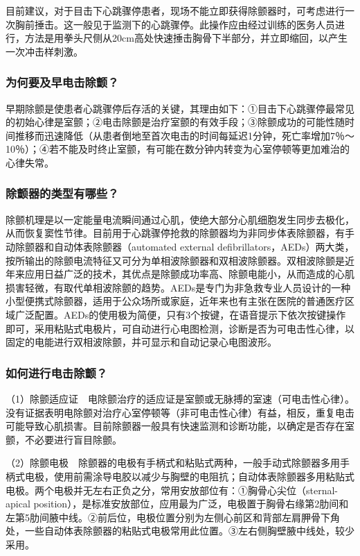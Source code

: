 目前建议，对于目击下心跳骤停患者，现场不能立即获得除颤器时，可考虑进行一次胸前捶击。这一般见于监测下的心跳骤停。此操作应由经过训练的医务人员进行，方法是用拳头尺侧从20cm高处快速捶击胸骨下半部分，并立即缩回，以产生一次冲击样刺激。

\subsubsection{为何要及早电击除颤？}

早期除颤是使患者心跳骤停后存活的关键，其理由如下：①目击下心跳骤停最常见的初始心律是室颤；②电击除颤是治疗室颤的有效手段；③除颤成功的可能性随时间推移而迅速降低（从患者倒地至首次电击的时间每延迟1分钟，死亡率增加7％～10％）；④若不能及时终止室颤，有可能在数分钟内转变为心室停顿等更加难治的心律失常。

\subsubsection{除颤器的类型有哪些？}

除颤机理是以一定能量电流瞬间通过心肌，使绝大部分心肌细胞发生同步去极化，从而恢复窦性节律。目前用于心跳骤停抢救的除颤器均为非同步体表除颤器，有手动除颤器和自动体表除颤器（automated
external
defibrillators，AEDs）两大类，按所输出的除颤电流特征又可分为单相波除颤器和双相波除颤器。双相波除颤是近年来应用日益广泛的技术，其优点是除颤成功率高、除颤电能小，从而造成的心肌损害轻微，有取代单相波除颤的趋势。AEDs是专门为非急救专业人员设计的一种小型便携式除颤器，适用于公众场所或家庭，近年来也有主张在医院的普通医疗区域广泛配置。AEDs的使用极为简便，只有3个按键，在语音提示下依次按键操作即可，采用粘贴式电极片，可自动进行心电图检测，诊断是否为可电击性心律，以固定的电能进行双相波除颤，并可显示和自动记录心电图波形。

\subsubsection{如何进行电击除颤？}

（1）除颤适应证　电除颤治疗的适应证是室颤或无脉搏的室速（可电击性心律）。没有证据表明电除颤对治疗心室停顿等（非可电击性心律）有益，相反，重复电击可能导致心肌损害。目前除颤器一般具有快速监测和诊断功能，以确定是否存在室颤，不必要进行盲目除颤。

（2）除颤电极　除颤器的电极有手柄式和粘贴式两种，一般手动式除颤器多用手柄式电极，使用前需涂导电胶以减少与胸壁的电阻抗；自动体表除颤器多用粘贴式电极。两个电极并无左右正负之分，常用安放部位有：①胸骨心尖位（sternal-apical
position），是标准安放部位，应用最为广泛，电极置于胸骨右缘第2肋间和左第5肋间腋中线。②前后位，电极位置分别为左侧心前区和背部左肩胛骨下角处，一些自动体表除颤器的粘贴式电极常用此位置。③左右侧胸壁腋中线处，较少采用。


